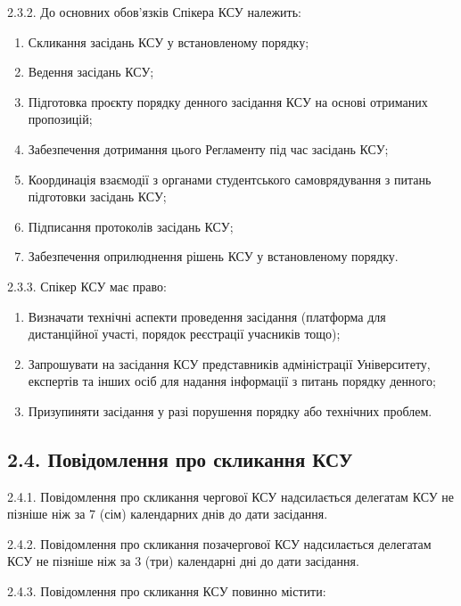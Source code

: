     2.3.2. До основних обов'язків Спікера КСУ належить:

        \begin{enumerate}[label=\alph*)]
            \item Скликання засідань КСУ у встановленому порядку;
            \item Ведення засідань КСУ;
            \item Підготовка проєкту порядку денного засідання КСУ на основі отриманих пропозицій;
            \item Забезпечення дотримання цього Регламенту під час засідань КСУ;
            \item Координація взаємодії з органами студентського самоврядування з питань підготовки засідань КСУ;
            \item Підписання протоколів засідань КСУ;
            \item Забезпечення оприлюднення рішень КСУ у встановленому порядку.
        \end{enumerate}

    2.3.3. Спікер КСУ має право:

        \begin{enumerate}[label=\alph*)]
            \item Визначати технічні аспекти проведення засідання (платформа для дистанційної участі, порядок реєстрації учасників тощо);
            \item Запрошувати на засідання КСУ представників адміністрації Університету, експертів та інших осіб для надання інформації з питань порядку денного;
            \item Призупиняти засідання у разі порушення порядку або технічних проблем.
        \end{enumerate}

\subsection*{2.4. Повідомлення про скликання КСУ}
    2.4.1. Повідомлення про скликання чергової КСУ надсилається делегатам КСУ не пізніше ніж за 7 (сім) календарних днів до дати засідання.

    2.4.2. Повідомлення про скликання позачергової КСУ надсилається делегатам КСУ не пізніше ніж за 3 (три) календарні дні до дати засідання.

    2.4.3. Повідомлення про скликання КСУ повинно містити:


